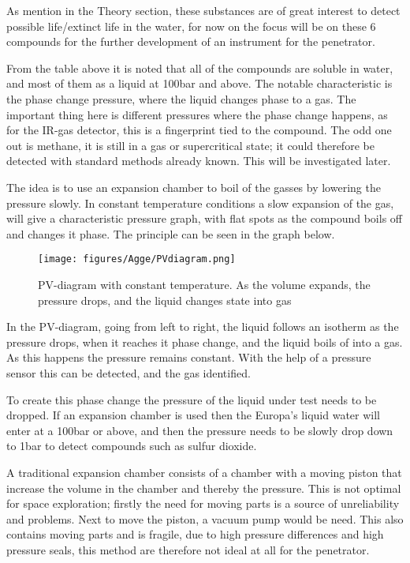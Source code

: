 \documentclass[10pt,a4paper,draft]{report}
\begin{document}
As mention in the Theory section, these substances are of great interest to detect possible life/extinct life in the water, for now on the focus will be on these 6 compounds for the further development of an instrument for the penetrator.\par

From the table above it is noted that all of the compounds are soluble in water, and most of them as a liquid at 100bar and above. The notable characteristic is the phase change pressure, where the liquid changes phase to a gas. The important thing here is different pressures where the phase change happens, as for the IR-gas detector, this is a fingerprint tied to the compound. The odd one out is methane, it is still in a gas or supercritical state; it could therefore be detected with standard methods already known.  This will be investigated later. \par

The idea is to use an expansion chamber to boil of the gasses by lowering the pressure slowly. In constant temperature conditions a slow expansion of the gas, will give a characteristic pressure graph, with flat spots as the compound boils off and changes it phase. The principle can be seen in the graph below. \par

\begin{figure}[H]
\caption{PV-diagram with constant temperature. As the volume expands, the pressure drops, and the liquid changes state into gas}
\centering
\texttt{[image: figures/Agge/PVdiagram.png]}  
\end{figure}

In the PV-diagram, going from left to right, the liquid follows an isotherm as the pressure drops, when it reaches it phase change, and the liquid boils of into a gas. As this happens the pressure remains constant. With the help of a pressure sensor this can be detected, and the gas identified. \par

To create this phase change the pressure of the liquid under test needs to be dropped. If an expansion chamber is used then the Europa’s liquid water will enter at a 100bar or above, and then the pressure needs to be slowly drop down to 1bar to detect compounds such as sulfur dioxide.\par

A traditional expansion chamber consists of a chamber with a moving piston that increase the volume in the chamber and thereby the pressure. This is not optimal for space exploration; firstly the need for moving parts is a source of unreliability and problems. Next to move the piston, a vacuum pump would be need. This also contains moving parts and is fragile, due to high pressure differences and high pressure seals, this method are therefore not ideal at all for the penetrator.\par
\end{document}
